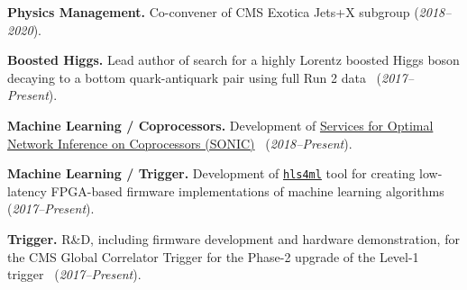 \documentclass[11pt]{res}
\begin{document}
\begin{resume}
\textbf{Physics Management.} Co-convener of CMS Exotica Jets+X subgroup (\textit{2018--2020}).

\textbf{Boosted Higgs.} Lead author of search for a highly Lorentz boosted Higgs boson
  decaying to a bottom quark-antiquark pair using full Run 2 data~\cite{Sirunyan:2020hwz} (\textit{2017--Present}).

\textbf{Machine Learning / Coprocessors.} Development of \href{https://github.com/fastmachinelearning/SonicCMS}{Services for Optimal Network Inference on Coprocessors (SONIC)}~\cite{Rankin:2020usv,Krupa:2020bwg,neurips2019_sonic,Duarte:2019fta} (\textit{2018--Present}).

\textbf{Machine Learning / Trigger.} Development of \href{https://fastmachinelearning.org/hls4ml/}{\texttt{hls4ml}} tool for creating low-latency FPGA-based firmware implementations of machine learning algorithms~\cite{Heintz:2020soy,Iiyama:2020wap,DiGuglielmo:2020eqx,Summers:2020xiy,neurips2019_hls4ml,Duarte:2018ite} (\textit{2017--Present}).

\textbf{Trigger.} R\&D, including firmware development and hardware demonstration, for the CMS Global Correlator Trigger for the Phase-2 upgrade of the Level-1 trigger~\cite{CERN-LHCC-2020-004} (\emph{2017--Present}).


\end{resume}
\end{document}
